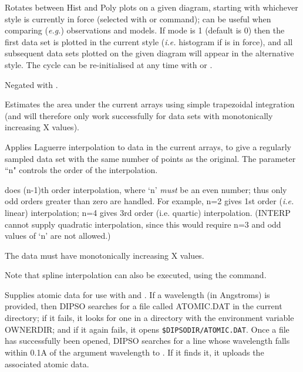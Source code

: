 \begin {description}
Rotates between Hist and Poly plots on a given diagram, starting with
whichever style is currently in force (selected with   or  
command); can be useful when comparing ({\em e.g.}) observations and
models. If mode is 1 (default is 0) then the first data set is plotted
in the current style ({\em i.e.} histogram if   is in force), and
all subsequent data sets plotted on the given diagram will appear in
the alternative style. The cycle can be re-initialised at any time
with   or . 

Negated with . 

Estimates the area under the current arrays using simple trapezoidal
integration (and will therefore only work successfully for data sets
with monotonically increasing X values).

Applies Laguerre interpolation to data in the current arrays, to give
a regularly sampled data set with the same number of points as the
original. The parameter ``n" controls the order of the interpolation.

  does (n-1)th order interpolation, where `n' {\it must}\/ be an
even number; thus only odd orders greater than zero are handled.
For example, n=2 gives 1st order ({\em i.e.} linear) interpolation;
n=4 gives 3rd order (i.e. quartic) interpolation. (INTERP cannot
supply quadratic interpolation, since this would require n=3 and odd
values of `n' are not allowed.)

The data must have monotonically increasing X values.

Note that spline interpolation can also be executed, using the  
command.

Supplies atomic data for use with   and .  If a wavelength (in
Angstroms) is provided, then DIPSO searches for a file called ATOMIC.DAT in the
current directory; if it fails, it looks for one in a directory with the
environment variable OWNERDIR; and if it again fails, it opens
{\tt{\$DIPSODIR/ATOMIC.DAT}}.  Once a
file has successfully been opened, DIPSO searches for a line whose wavelength
falls within 0.1A of the argument wavelength to .  If it finds it, it
uploads the associated atomic data.


\end{description}

